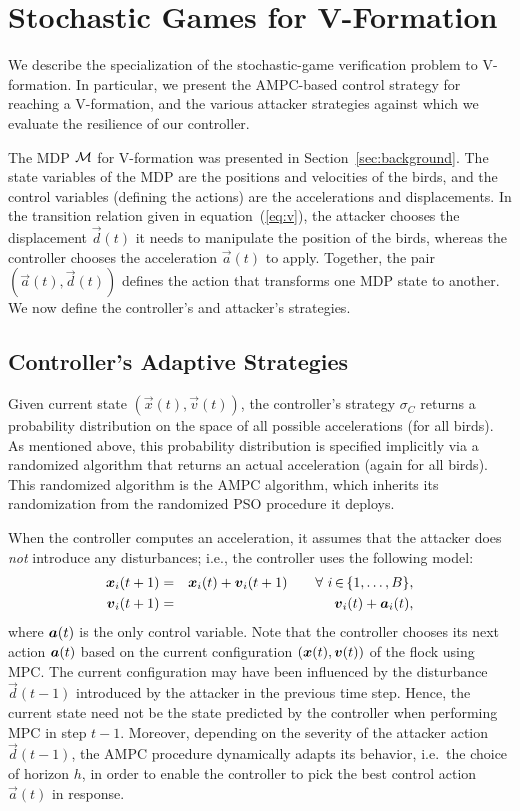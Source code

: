 \newcommand{\anoise}{{\mathcal{AN}}}
\newcommand{\pnoise}{{\mathcal{PN}}}
\section{Stochastic Games for V-Formation}
\label{sec:sgv}

We describe the specialization of the stochastic-game verification problem to
V-formation.  In particular, we present the AMPC-based control strategy for reaching a V-formation, and the various attacker strategies against which we evaluate the resilience of our controller.

The MDP ${\mathcal{M}}$ for V-formation was presented in Section~\ref{sec:background}. The state variables of the MDP are the positions and velocities of the birds, and the control variables (defining the actions) are the accelerations and displacements. In the transition relation given in equation~(\ref{eq:v}), the attacker chooses the displacement $\vec{d}(t)$ it needs to manipulate the position of the birds,
whereas the controller chooses the acceleration $\vec{a}(t)$ to apply. Together, the pair $(\vec{a}(t),\vec{d}(t))$ defines the action that transforms one MDP state to another. We now define the controller's and attacker's strategies.

\subsection{Controller's Adaptive Strategies}

Given current state $(\vec{x}(t),\vec{v}(t))$, the controller's strategy $\sigma_C$ returns a probability distribution on the space of all possible accelerations (for all birds).  As mentioned above, this probability distribution is specified implicitly via a randomized algorithm that returns an actual acceleration (again for all birds).  This randomized algorithm is the AMPC algorithm, which inherits its randomization from the randomized PSO procedure it deploys.  

When the controller computes an acceleration, it assumes that the attacker does {\em{not}} introduce any disturbances; i.e., the controller uses the following model:
\vspace*{-4mm}\begin{eqnarray}
 \xv_i(t + 1) &=& \xv_i(t) + \vv_i(t+1) \qquad \forall~i\,{\in}\,\{1,\ldots,B\}, \nonumber \\
 \vv_i(t + 1) &=& \vv_i(t) + \va_i(t), \label{eq:noattack} %
\end{eqnarray}
where ${\boldsymbol {a}}(t)$ is the only control variable. Note that the controller chooses its next action ${\boldsymbol {a}}(t)$ based on the current configuration $({\boldsymbol {x}}(t),{\boldsymbol {v}}(t))$ of the flock using MPC. The current configuration may have been influenced by the disturbance $\vec{d}(t-1)$ introduced by the attacker in the previous time step.  Hence, the current state need not be the state predicted by the controller when performing MPC in step $t-1$. Moreover, depending on the severity of the attacker action $\vec{d}(t-1)$, the AMPC procedure dynamically adapts its behavior, i.e.\ the choice of horizon $h$, in order to enable the controller to pick the best control action $\vec{a}(t)$ in response.

